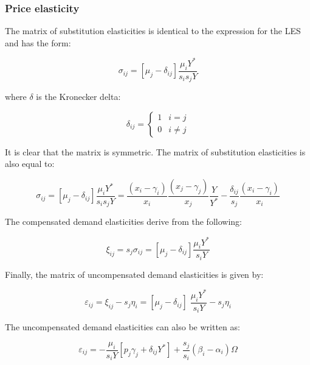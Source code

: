\subsubsection{Price elasticity}

The matrix of substitution elasticities is identical to the expression for the LES and has the form:

\begin{equation}
\label{eq:AIDADSAPE}
\sigma_{ij} = \left[ {{\mu_j} - {\delta_{ij}}} \right]
   \frac{{{\mu_i}{Y^*}}}{{{s_i}{s_j}Y}}
\end{equation}

\noindent where $\delta$ is the Kronecker delta:

\[
{\delta _{ij}} = \left\{ {\begin{array}{*{20}{c}}
1&{i = j}\\
0&{i \ne j}
\end{array}} \right.
\]

\noindent It is clear that the matrix is symmetric.
The matrix of substitution elasticities is also equal to:

\[{\sigma _{ij}} = \left[ {{\mu _j} - {\delta _{ij}}} \right]
   \frac{{{\mu _i}{Y^*}}}{{{s_i}{s_j}Y}} = \frac{{\left( {{x_i} - {\gamma _i}} \right)}}
   {{{x_i}}}\frac{{\left( {{x_j} - {\gamma _j}} \right)}}{{{x_j}}}\frac{Y}{{{Y^*}}} -
   \frac{{{\delta _{ij}}}}{{{s_j}}}\frac{{\left( {{x_i} - {\gamma _i}} \right)}}{{{x_i}}}
\]

The compensated demand elasticities derive from the following:

\begin{equation}
\label{eq:AIDADSCDE}
{\xi _{ij}} = {s_j}{\sigma _{ij}} = \left[ {{\mu _j} - {\delta _{ij}}} \right]
   \frac{{{\mu _i}{Y^*}}}{{{s_i}Y}}
\end{equation}

Finally, the matrix of uncompensated demand elasticities is given by:

\begin{equation}
\label{eq:AIDADSUED1}
{\varepsilon _{ij}} = {\xi _{ij}} - {s_j}{\eta _i} =
   \left[ {{\mu _j} - {\delta _{ij}}} \right]\;\frac{{{\mu _i}{Y^*}}}{{{s_i}Y}} - {s_j}{\eta _i}
\end{equation}

\noindent The uncompensated demand elasticities can also be written as:

\begin{equation}
\label{eq:AIDADSUED2}
{\varepsilon _{ij}} =  - \frac{{{\mu _i}}}{{{s_i}Y}}\left[ {{p_j}{\gamma _j} +
   {\delta _{ij}}{Y^*}} \right] +
   \frac{{{s_j}}}{{{s_i}}}\left( {{\beta _i} - {\alpha _i}} \right)\Omega
\end{equation}

